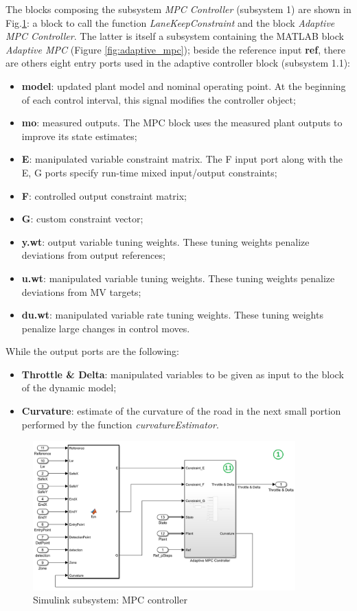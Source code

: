  The blocks composing the subsystem \textit{MPC Controller} (subsystem 1) are shown in Fig.\ref{fig:simulink_mpc}: a block to call the function \textit{LaneKeepConstraint} and the block \textit{Adaptive MPC Controller}. The latter is itself a subsystem containing the MATLAB block \textit{Adaptive MPC} (Figure \ref{fig:adaptive_mpc}); beside the reference input \textbf{ref}, there are others eight entry ports used in the adaptive controller block (subsystem 1.1):
 \begin{itemize}
     \item \textbf{model}: updated plant model and nominal operating point. At the beginning of each control interval, this signal modifies the controller object;
     \item \textbf{mo}: measured outputs. The MPC block uses the measured plant outputs to improve its state estimates;
     \item \textbf{E}: manipulated variable constraint matrix. The F input port along with the E, G ports specify run-time mixed input/output constraints;
     \item \textbf{F}: controlled output constraint matrix;
     \item \textbf{G}: custom constraint vector;
     \item \textbf{y.wt}: output variable tuning weights. These tuning weights penalize deviations from output references;
     \item \textbf{u.wt}: manipulated variable tuning weights.  These tuning weights penalize deviations from MV targets;
     \item \textbf{du.wt}: manipulated variable rate tuning weights. These tuning weights penalize large changes in control moves.
 \end{itemize}     
 
 While the output ports are the following:
  \begin{itemize}
     \item \textbf{Throttle \& Delta}: manipulated variables to be given as input to the block of the dynamic model;
     \item \textbf{Curvature}: estimate of the curvature of the road in the next small portion performed by the function \textit{curvatureEstimator}.
 \end{itemize}
 
\begin{figure}[H]
    \centering
    \includegraphics[width=0.9\textwidth]{Figures/simulink_mpc.png}
    \caption{Simulink subsystem: MPC controller}
    \label{fig:simulink_mpc}
\end{figure}
 
